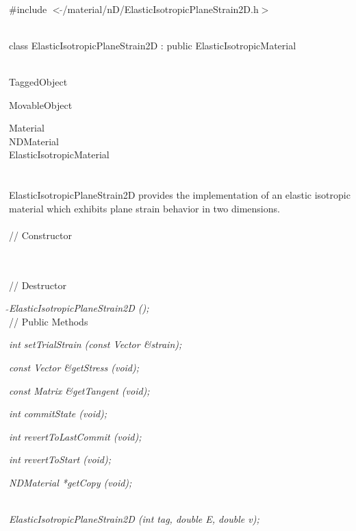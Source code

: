 
   \\
\#include $<\tilde{ }$/material/nD/ElasticIsotropicPlaneStrain2D.h$>$  


  \\
class ElasticIsotropicPlaneStrain2D : public ElasticIsotropicMaterial 


 \\
TaggedObject 

MovableObject 

\indent\indent Material \\
\indent\indent\indent NDMaterial \\
\indent\indent\indent\indent ElasticIsotropicMaterial \\
\indent\indent\indent\indent{} \\

  \\
ElasticIsotropicPlaneStrain2D provides the implementation of an
elastic isotropic material which exhibits plane strain behavior in two
dimensions. \\

 \\
// Constructor 

  \\ \\
// Destructor 

{\em $\tilde{ }$ElasticIsotropicPlaneStrain2D ();}\\ 

// Public Methods 

{\em int setTrialStrain (const Vector \&strain); } 

{\em const Vector \&getStress (void); } 

{\em const Matrix \&getTangent (void); } 

{\em int commitState (void); } 

{\em int revertToLastCommit (void); } 

{\em int revertToStart (void); } 

{\em NDMaterial *getCopy (void); } 


  \\
{\em ElasticIsotropicPlaneStrain2D (int tag, double E, double v);}  

